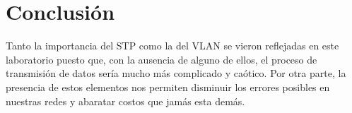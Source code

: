 \documentclass{article}
\begin{document}
\section{Conclusión\vspace{0.5cm}}

Tanto la importancia del STP como la del VLAN se vieron reflejadas en este laboratorio puesto que, con la ausencia de alguno de ellos, el proceso de transmisión de datos sería mucho más complicado y caótico. Por otra parte, la presencia de estos elementos nos permiten disminuir los errores posibles en nuestras redes y abaratar costos que jamás esta demás.
\end{document}
